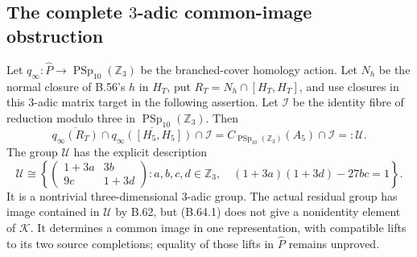 \subsection*{The complete $3$-adic common-image obstruction}

Let $q_\infty:\widehat P\to\operatorname{PSp}_{10}(\mathbb Z_3)$
be the branched-cover homology action.
Let $N_h$ be the normal closure of B.56's $h$ in $H_T$,
put $R_T=N_h\cap[H_T,H_T]$, and use closures in this
$3$-adic matrix target in the following assertion.
Let $\mathcal I$ be the identity fibre of reduction
modulo three in $\operatorname{PSp}_{10}(\mathbb Z_3)$.
Then
\[
 \overline{q_\infty(R_T)}\cap
 \overline{q_\infty([H_5,H_5])}\cap\mathcal I
       =C_{\operatorname{PSp}_{10}(\mathbb Z_3)}(A_5)
                      \cap\mathcal I
       =:\mathcal U.                                      \tag{B.64.1}
\]
The group $\mathcal U$ has the explicit description
\[
 \mathcal U\cong
 \left\{
 \begin{pmatrix}1+3a&3b\\9c&1+3d\end{pmatrix}:
 a,b,c,d\in\mathbb Z_3,\quad
 (1+3a)(1+3d)-27bc=1
 \right\}.                                                \tag{B.64.2}
\]
It is a nontrivial three-dimensional $3$-adic group.
The actual residual group has image contained in
$\mathcal U$ by B.62, but (B.64.1) does not give a
nonidentity element of $\mathcal K$.
It determines a common image in one representation,
with compatible lifts to its two source completions;
equality of those lifts in $\widehat P$ remains unproved.

